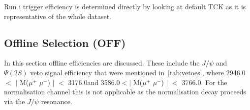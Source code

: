 Run \Rn{1} trigger efficiency is determined directly by looking at default TCK as it is representative of the whole dataset.%





\subsection{Offline Selection (OFF)}

In this section offline efficiencies are discussed. These include the $J/\psi$ and $\Psi(2S)$ veto signal efficiency that were mentioned in~\autoref{tab:vetoes}, where 2946.0\mevcc $<$ $|$ M($\mu^{+}$ $\mu^{-}$) $|$ $<$ 3176.0\mevcc and 3586.0\mevcc $<|$ M($\mu^{+}$ $\mu^{-}$) $|$ $<$ 3766.0\mevcc. For the normalisation channel this is not applicable as the normalisation decay proceeds via the $J/\psi$ resonance.



